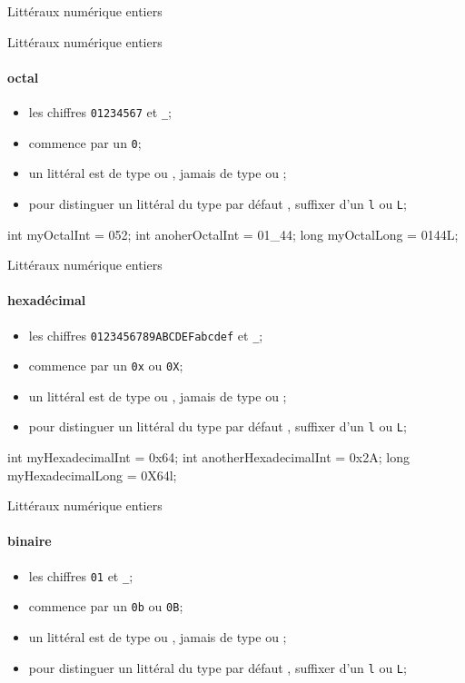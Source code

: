\begin{hideedit}
\begin{frame}[fragile]{Littéraux numérique entiers}
\end{frame}

\begin{frame}[fragile]{Littéraux numérique entiers}
  \framesubtitle{octal}
  \begin{itemize}
    \item les chiffres \texttt{01234567} et \texttt{\_};
    \item commence par un \texttt{0};
    \item un littéral est de type  ou , jamais de type
       ou ;
    \item pour distinguer un littéral  du type par défaut , suffixer
      d'un \texttt{l} ou \texttt{L};
  \end{itemize}

  \pause
  \begin{java}
int myOctalInt = 052;
int anoherOctalInt = 01_44;
long myOctalLong = 0144L;
  \end{java}
\end{frame}

\begin{frame}[fragile]{Littéraux numérique entiers}
  \framesubtitle{hexadécimal}
  \begin{itemize}
    \item les chiffres \texttt{0123456789ABCDEFabcdef} et \texttt{\_};
    \item commence par un \texttt{0x} ou \texttt{0X};
    \item un littéral est de type  ou , jamais de type
       ou ;
    \item pour distinguer un littéral  du type par défaut , suffixer
      d'un \texttt{l} ou \texttt{L};
  \end{itemize}

  \pause
  \begin{java}
int myHexadecimalInt = 0x64;
int anotherHexadecimalInt = 0x2A;
long myHexadecimalLong = 0X64l;
  \end{java}
\end{frame}

\begin{frame}[fragile]{Littéraux numérique entiers}
  \framesubtitle{binaire}
  \begin{itemize}
    \item les chiffres \texttt{01} et \texttt{\_};
    \item commence par un \texttt{0b} ou \texttt{0B};
    \item un littéral est de type  ou , jamais de type
       ou ;
    \item pour distinguer un littéral  du type par défaut , suffixer
      d'un \texttt{l} ou \texttt{L};
  \end{itemize}


\end{frame}
\end{hideedit}
